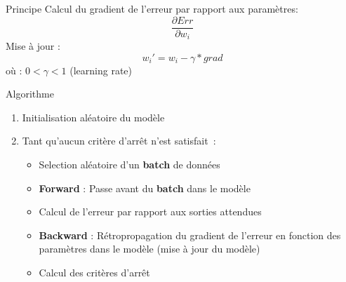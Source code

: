 
\begin{frame}{Principe}
  Calcul du gradient de l'erreur par rapport aux paramètres:
  \[
  \frac{\partial{Err}}{\partial{w_i}}
  \]
  Mise à jour :
  \[
  w_i' = w_i - \gamma * grad 
  \]
  où : $0 < \gamma < 1$ (learning rate)
\end{frame}

\begin{frame}{Algorithme}
  \begin{enumerate}[<+->]
    \item Initialisation aléatoire du modèle
    \item Tant qu'aucun critère d'arrêt n'est satisfait~:
      \begin{itemize}
        \item Selection aléatoire d'un \textbf{batch} de données
        \item \textbf{Forward} : Passe avant du \textbf{batch} dans le modèle
        \item Calcul de l'erreur par rapport aux sorties attendues
        \item \textbf{Backward} : Rétropropagation du gradient de l'erreur en fonction des paramètres dans le modèle (mise à jour du modèle)
        \item Calcul des critères d'arrêt
      \end{itemize}
  \end{enumerate}
\end{frame}


